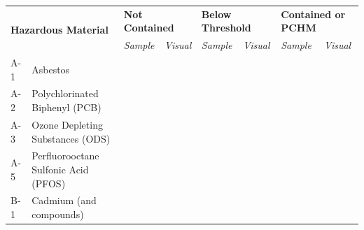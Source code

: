 \documentclass{article}
\begin{document}
\renewcommand{\arraystretch}{1.4}
\begin{center}
\begin{table}[H]
\begin{tabular}{|ll|ll|ll|ll|}
\hline
\multicolumn{2}{|l|}{\multirow{2}{*}{\textbf{Hazardous Material}}}                                                        & \multicolumn{2}{l|}{\textbf{Not Contained}}            & \multicolumn{2}{l|}{\textbf{Below Threshold}}          & \multicolumn{2}{l|}{\textbf{Contained or PCHM}}        \\ \cline{3-8} 
\multicolumn{2}{|l|}{}                                                                                                    & \multicolumn{1}{l|}{\textit{Sample}} & \textit{Visual} & \multicolumn{1}{l|}{\textit{Sample}} & \textit{Visual} & \multicolumn{1}{l|}{\textit{Sample}} & \textit{Visual} \\ \hline
\multicolumn{1}{|l|}{A-1}           & Asbestos                                                                            & \multicolumn{1}{l|}{}                &                 & \multicolumn{1}{l|}{}                &                 & \multicolumn{1}{l|}{}                &                 \\ \hline
\multicolumn{1}{|l|}{A-2}           & Polychlorinated Biphenyl (PCB)                                                      & \multicolumn{1}{l|}{}                &                 & \multicolumn{1}{l|}{}                &                 & \multicolumn{1}{l|}{}                &                 \\ \hline
\multicolumn{1}{|l|}{A-3}           & Ozone Depleting Substances (ODS)                                                    & \multicolumn{1}{l|}{}                &                 & \multicolumn{1}{l|}{}                &                 & \multicolumn{1}{l|}{}                &                 \\ \hline
\multicolumn{1}{|l|}{A-5}           & Perfluorooctane Sulfonic Acid (PFOS)                                                & \multicolumn{1}{l|}{}                &                 & \multicolumn{1}{l|}{}                &                 & \multicolumn{1}{l|}{}                &                 \\ \hline
\multicolumn{1}{|l|}{B-1}           & Cadmium (and compounds)                                                             & \multicolumn{1}{l|}{}                &                 & \multicolumn{1}{l|}{}                &                 & \multicolumn{1}{l|}{}                &                 \\ \hline

\end{tabular}
\end{table}
\end{center}
\end{document}
